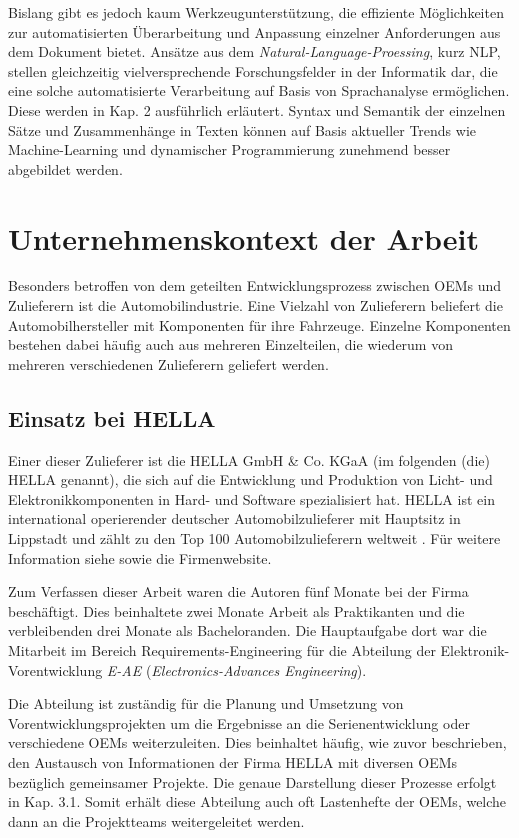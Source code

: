 \documentclass[12pt]{report}
\begin{document}
Bislang gibt es jedoch kaum Werkzeugunterstützung, die effiziente Möglichkeiten zur automatisierten Überarbeitung und Anpassung einzelner Anforderungen aus dem Dokument bietet. Ansätze aus dem \textit{Natural-Language-Proessing}, kurz NLP, stellen gleichzeitig vielversprechende Forschungsfelder in der Informatik dar, die eine solche automatisierte Verarbeitung auf Basis von Sprachanalyse ermöglichen. Diese werden in Kap. 2 ausführlich erläutert. Syntax und Semantik der einzelnen Sätze und Zusammenhänge in Texten können auf Basis aktueller Trends wie Machine-Learning und dynamischer Programmierung zunehmend besser abgebildet werden.

\section[Unternehmenskontext]{Unternehmenskontext der Arbeit}
Besonders betroffen von dem geteilten Entwicklungsprozess zwischen OEMs und Zulieferern ist die Automobilindustrie. Eine Vielzahl von Zulieferern beliefert die Automobilhersteller mit Komponenten für ihre Fahrzeuge. Einzelne Komponenten bestehen dabei häufig auch aus mehreren Einzelteilen, die wiederum von mehreren verschiedenen Zulieferern geliefert werden. \cite{awk06}

\subsection{Einsatz bei HELLA}
Einer dieser Zulieferer ist die HELLA GmbH \& Co. KGaA (im folgenden (die) HELLA genannt), die sich auf die Entwicklung und Produktion von Licht- und Elektronikkomponenten in Hard- und Software spezialisiert hat. HELLA ist ein international operierender deutscher Automobilzulieferer mit Hauptsitz in Lippstadt und zählt zu den Top 100 Automobilzulieferern weltweit \cite{lv10}. Für weitere Information siehe \cite{he19} sowie die Firmenwebsite. 

Zum Verfassen dieser Arbeit waren die Autoren fünf Monate bei der Firma beschäftigt. Dies beinhaltete zwei Monate Arbeit als Praktikanten und die verbleibenden drei Monate als Bacheloranden. 
Die Hauptaufgabe dort war die Mitarbeit im Bereich Requirements-Engineering für die Abteilung der Elektronik-Vorentwicklung \textit{E-AE} (\textit{Electronics-Advances Engineering}). 

Die Abteilung ist zuständig für die Planung und Umsetzung von Vorentwicklungsprojekten um die Ergebnisse an die Serienentwicklung oder verschiedene OEMs weiterzuleiten. Dies beinhaltet häufig, wie zuvor beschrieben, den Austausch von Informationen der Firma HELLA mit diversen OEMs bezüglich gemeinsamer Projekte. Die genaue Darstellung dieser Prozesse erfolgt in Kap. 3.1. Somit erhält diese Abteilung auch oft Lastenhefte der OEMs, welche dann an die Projektteams weitergeleitet werden. 
\end{document}
